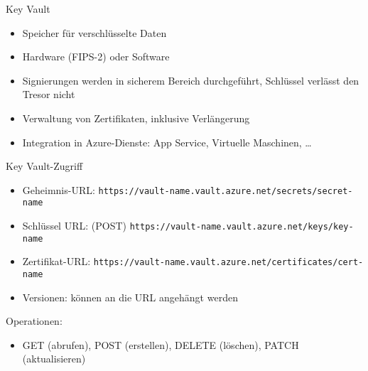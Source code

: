 \begin{flashcard}[Definition]{Key Vault}
    \begin{itemize}
        \item Speicher für verschlüsselte Daten
        \item Hardware (FIPS-2) oder Software
        \item Signierungen werden in sicherem Bereich durchgeführt, Schlüssel verlässt den Tresor nicht
        \item Verwaltung von Zertifikaten, inklusive Verlängerung
        \item Integration in Azure-Dienste: App Service, Virtuelle Maschinen, \ldots
    \end{itemize}
\end{flashcard}

\begin{flashcard}[Definition]{Key Vault-Zugriff}
    \begin{itemize}
        \item Geheimnis-URL:\newline
            \texttt{https://vault-name.vault.azure.net/secrets/secret-name}\newline
        \item Schlüssel URL: (POST)\newline
            \texttt{https://vault-name.vault.azure.net/keys/key-name}\newline
        \item Zertifikat-URL:\newline
            \texttt{https://vault-name.vault.azure.net/certificates/cert-name}\newline
        \item Versionen: können an die URL angehängt werden
    \end{itemize}
    Operationen:
    \begin{itemize}
        \item GET (abrufen), POST (erstellen), DELETE (löschen), PATCH (aktualisieren)
    \end{itemize}
\end{flashcard}



